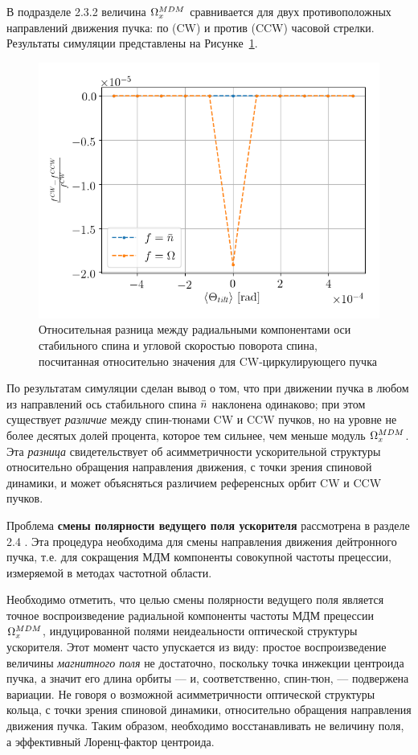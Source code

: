 В подразделе 2.3.2 величина $\Omega_x^{MDM}$ сравнивается для двух противоположных направлений движения пучка:
по (CW) и против (CCW) часовой стрелки. Результаты симуляции представлены на Рисунке~\ref{fig:syst:asym}.

\begin{figure}[H]\centering
	\includegraphics[height=.35\paperheight]{images/fake_signal_sim/linearity_test_shifting_gauss_rel_diff}	
	\caption{Относительная разница между радиальными компонентами оси стабильного спина и угловой скоростью поворота спина, посчитанная относительно значения для CW-циркулирующего пучка\label{fig:syst:asym}}
\end{figure}

По результатам симуляции сделан вывод о том, что при движении пучка в любом из направлений 
ось стабильного спина $\bar n$ наклонена одинаково; при этом существует \emph{различие} 
между спин-тюнами CW и CCW пучков, но на уровне не более десятых долей процента, 
которое тем сильнее, чем меньше модуль $\Omega_x^{MDM}$. 
Эта \emph{разница}  свидетельствует об асимметричности ускорительной структуры 
относительно обращения направления движения, с точки зрения спиновой динамики, 
и может объясняться различием референсных орбит CW и CCW пучков. 

Проблема \textbf{смены полярности ведущего поля ускорителя} рассмотрена в разделе 2.4 . 
Эта процедура необходима для смены направления движения дейтронного пучка, 
т.е. для сокращения МДМ компоненты совокупной частоты прецессии, измеряемой в методах частотной области. 

Необходимо отметить, что целью смены полярности ведущего поля является 
точное воспроизведение радиальной компоненты частоты МДМ прецессии $\Omega_x^{MDM}$, 
индуцированной полями неидеальности оптической структуры ускорителя. 
Этот момент часто упускается из виду: простое воспроизведение величины \emph{магнитного поля} 
не достаточно, поскольку точка инжекции центроида пучка, а значит его длина орбиты --- 
и, соответственно, спин-тюн, --- подвержена вариации. Не говоря о возможной асимметричности 
оптической структуры кольца, с точки зрения спиновой динамики, относительно 
обращения направления движения пучка. Таким образом, необходимо восстанавливать не величину поля, 
а эффективный Лоренц-фактор центроида.

